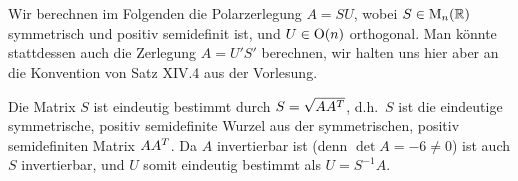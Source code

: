 \section{}

Wir berechnen im Folgenden die Polarzerlegung $A = SU$, wobei $S \in \operatorname{M}_{n}(\mathbb{R})$ symmetrisch und positiv semidefinit ist, und $U \in \operatorname{O}(n)$ orthogonal.
Man könnte stattdessen auch die Zerlegung $A = U'S'$ berechnen, wir halten uns hier aber an die Konvention von Satz XIV.4 aus der Vorlesung.

Die Matrix $S$ ist eindeutig bestimmt durch $S = \sqrt{A A^T}$, d.h.\ $S$ ist die eindeutige symmetrische, positiv semidefinite Wurzel aus der symmetrischen, positiv semidefiniten Matrix $A A^T$.
Da $A$ invertierbar ist (denn $\det A = -6 \neq 0$) ist auch $S$ invertierbar, und $U$ somit eindeutig bestimmt als $U = S^{-1} A$.

